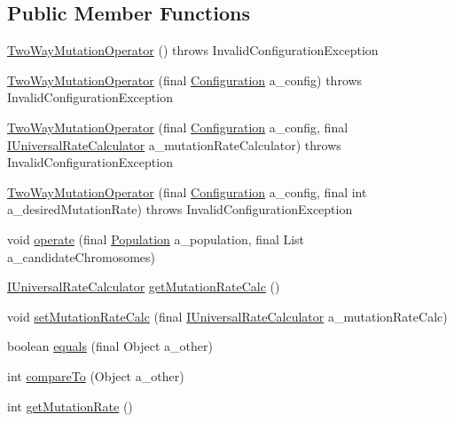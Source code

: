 \subsection*{Public Member Functions}
\begin{DoxyCompactItemize}
\item 
\hyperlink{classorg_1_1jgap_1_1impl_1_1_two_way_mutation_operator_a85c99216cb3541baba946663089c71b0}{Two\-Way\-Mutation\-Operator} ()  throws Invalid\-Configuration\-Exception 
\item 
\hyperlink{classorg_1_1jgap_1_1impl_1_1_two_way_mutation_operator_a14bff76bf6595e3565df9a4d64e840d1}{Two\-Way\-Mutation\-Operator} (final \hyperlink{classorg_1_1jgap_1_1_configuration}{Configuration} a\-\_\-config)  throws Invalid\-Configuration\-Exception 
\item 
\hyperlink{classorg_1_1jgap_1_1impl_1_1_two_way_mutation_operator_a790708c53d128438af2e5b75cea9d267}{Two\-Way\-Mutation\-Operator} (final \hyperlink{classorg_1_1jgap_1_1_configuration}{Configuration} a\-\_\-config, final \hyperlink{interfaceorg_1_1jgap_1_1_i_universal_rate_calculator}{I\-Universal\-Rate\-Calculator} a\-\_\-mutation\-Rate\-Calculator)  throws Invalid\-Configuration\-Exception 
\item 
\hyperlink{classorg_1_1jgap_1_1impl_1_1_two_way_mutation_operator_a5fb0b818973a6da4aa577fd7e0e7d132}{Two\-Way\-Mutation\-Operator} (final \hyperlink{classorg_1_1jgap_1_1_configuration}{Configuration} a\-\_\-config, final int a\-\_\-desired\-Mutation\-Rate)  throws Invalid\-Configuration\-Exception 
\item 
void \hyperlink{classorg_1_1jgap_1_1impl_1_1_two_way_mutation_operator_a53ac73cd4e6b197e6756d4efe02bd01e}{operate} (final \hyperlink{classorg_1_1jgap_1_1_population}{Population} a\-\_\-population, final List a\-\_\-candidate\-Chromosomes)
\item 
\hyperlink{interfaceorg_1_1jgap_1_1_i_universal_rate_calculator}{I\-Universal\-Rate\-Calculator} \hyperlink{classorg_1_1jgap_1_1impl_1_1_two_way_mutation_operator_a87ad794efe1b14c660330de4054d819f}{get\-Mutation\-Rate\-Calc} ()
\item 
void \hyperlink{classorg_1_1jgap_1_1impl_1_1_two_way_mutation_operator_af7720c96119b3e44c43664856d39e9fa}{set\-Mutation\-Rate\-Calc} (final \hyperlink{interfaceorg_1_1jgap_1_1_i_universal_rate_calculator}{I\-Universal\-Rate\-Calculator} a\-\_\-mutation\-Rate\-Calc)
\item 
boolean \hyperlink{classorg_1_1jgap_1_1impl_1_1_two_way_mutation_operator_af484c629e25ec9aa3f873119793faf2d}{equals} (final Object a\-\_\-other)
\item 
int \hyperlink{classorg_1_1jgap_1_1impl_1_1_two_way_mutation_operator_acc8b23fbd0c3b2ba1dea9c266eea9fe2}{compare\-To} (Object a\-\_\-other)
\item 
int \hyperlink{classorg_1_1jgap_1_1impl_1_1_two_way_mutation_operator_a929e74b0d9b86dfa7f0cb2ba88e347d3}{get\-Mutation\-Rate} ()
\end{DoxyCompactItemize}
